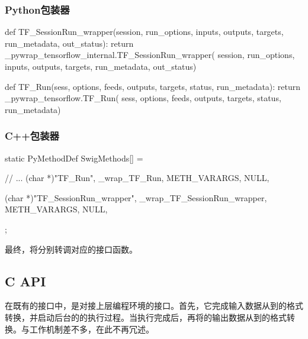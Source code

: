 \begin{content}
\subsubsection{Python包装器}

\begin{leftbar}
\begin{python}[caption={tensorflow/bazel-bin/tensorflow/python/pywrap\_tensorflow\_internal.py}]
def TF_SessionRun_wrapper(session, run_options, inputs, 
  outputs, targets, run_metadata, out_status):
  return _pywrap_tensorflow_internal.TF_SessionRun_wrapper(
    session, run_options, inputs, outputs, targets, run_metadata, out_status)

def TF_Run(sess, options, feeds, outputs, 
  targets, status, run_metadata):
  return _pywrap_tensorflow.TF_Run(
    sess, options, feeds, outputs, targets, status, run_metadata)
\end{python}
\end{leftbar}

\subsubsection{C++包装器}

\begin{leftbar}
\begin{c++}[caption={tensorflow/bazel-bin/tensorflow/python/pywrap\_tensorflow\_internal.cc}]
static PyMethodDef SwigMethods[] = {
  // ...
  { (char *)"TF_Run", 
    _wrap_TF_Run, METH_VARARGS, NULL},

  { (char *)"TF_SessionRun_wrapper", 
    _wrap_TF_SessionRun_wrapper, METH_VARARGS, NULL},
};
\end{c++}
\end{leftbar}

最终，将分别转调对应的接口函数。

\subsection{C API}

在既有的接口中，是对接上层编程环境的接口。首先，它完成输入数据从到\cpp{}的格式转换，并启动后台的的执行过程。当执行完成后，再将的输出数据从\cpp{}到的格式转换。与工作机制差不多，在此不再冗述。


\end{content}

